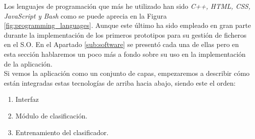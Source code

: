 \documentclass[a4paper,11pt]{book}
\begin{document}
Los lenguajes de programación que más he utilizado han sido \textit{C++, HTML, CSS, JavaScript y Bash} como se puede aprecia en la Figura \ref{fig:programming_languages}. Aunque este último ha sido empleado en gran parte durante la implementación de los primeros prototipos para su gestión de ficheros en el S.O. En el Apartado \ref{sub:software} se presentó cada una de ellas pero en esta sección hablaremos un poco más a fondo sobre su uso en la implementación de la aplicación.\\
Si vemos la aplicación como un conjunto de capas, empezaremos a describir cómo están integradas estas tecnologías de arriba hacia abajo, siendo este el orden:
\begin{enumerate}
	\item Interfaz
	\item Módulo de clasificación.
	\item Entrenamiento del clasificador.
\end{enumerate}
\end{document}
